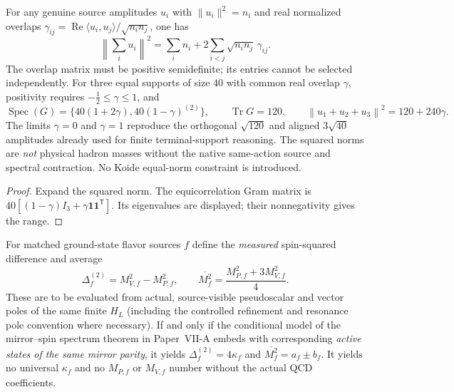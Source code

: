 \documentclass[12pt,a4paper]{article}
\begin{document}
\begin{proposition}
\label{p11:prop:v327-meson-gram-support}
For any genuine source amplitudes $u_i$ with
$\|u_i\|^2=n_i$ and real normalized overlaps
$\gamma_{ij}=\operatorname{Re}\langle u_i,u_j\rangle/
\sqrt{n_in_j}$, one has
\[
 \left\|\sum_i u_i\right\|^2
  =\sum_i n_i+2\sum_{i<j}\sqrt{n_in_j}\,\gamma_{ij}.
\]
The overlap matrix must be positive semidefinite; its entries
cannot be selected independently. For three equal supports of size
$40$ with common real overlap $\gamma$, positivity requires
$-\tfrac12\le\gamma\le1$, and
\[
 \operatorname{Spec}(G)=
 \{40(1+2\gamma),40(1-\gamma)^{(2)}\},\qquad
 \operatorname{Tr}G=120,
 \qquad \left\|u_1+u_2+u_3\right\|^2=120+240\gamma.
\]
The limits $\gamma=0$ and $\gamma=1$ reproduce the orthogonal
$\sqrt{120}$ and aligned $3\sqrt{40}$ amplitudes already
used for finite terminal-support reasoning. The squared norms are
\emph{not} physical hadron masses without the native same-action
source and spectral contraction. No Koide equal-norm constraint is
introduced.
\end{proposition}
\begin{proof}
Expand the squared norm. The equicorrelation Gram matrix is
$40[(1-\gamma)I_3+\gamma\mathbf1\mathbf1^{\mathsf T}]$.
Its eigenvalues are displayed; their nonnegativity gives the range.
\end{proof}

\begin{definition}
\label{p11:def:v327-meson-squared-gap-observable}
For matched ground-state flavor sources $f$ define the \emph{measured}
spin-squared difference and average
\[
 \Delta_f^{(2)}=M_{V,f}^2-M_{P,f}^2,\qquad
 \overline{M_f^2}=\frac{M_{P,f}^2+3M_{V,f}^2}{4}.
\]
These are to be evaluated from actual, source-visible pseudoscalar and
vector poles of the same finite $H_L$ (including the controlled
refinement and resonance pole convention where necessary).
If and only if the conditional model of the mirror--spin spectrum theorem in Paper~VII-A
embeds with corresponding \emph{active states of the same mirror
parity}, it yields $\Delta_f^{(2)}=4\kappa_f$ and
$\overline{M_f^2}=a_f\pm b_f$.
It yields no universal $\kappa_f$ and no $M_{P,f}$ or $M_{V,f}$
number without the actual QCD coefficients.
\end{definition}
\end{document}
